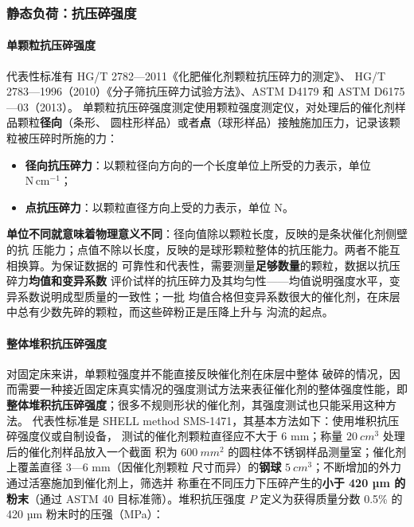 \subsubsection{静态负荷：抗压碎强度}

\paragraph{单颗粒抗压碎强度}代表性标准有 HG/T 2782—2011《化肥催化剂颗粒抗压碎力的测定》、
HG/T 2783—1996（2010）《分子筛抗压碎力试验方法》、ASTM D4179 和 ASTM D6175—03（2013）。
单颗粒抗压碎强度测定使用颗粒强度测定仪，对处理后的催化剂样品颗粒\textbf{径向}（条形、
圆柱形样品）或者\textbf{点}（球形样品）接触施加压力，记录该颗粒被压碎时所施的力：

\begin{itemize}
\item \textbf{径向抗压碎力}：以颗粒径向方向的一个长度单位上所受的力表示，单位
$\mathrm{N\,cm^{-1}}$；
\item \textbf{点抗压碎力}：以颗粒直径方向上受的力表示，单位 N。
\end{itemize}

\textbf{单位不同就意味着物理意义不同}：径向值除以颗粒长度，反映的是条状催化剂侧壁的抗
压能力；点值不除以长度，反映的是球形颗粒整体的抗压能力。两者不能互相换算。为保证数据的
可靠性和代表性，需要测量\textbf{足够数量}的颗粒，数据以抗压碎力\textbf{均值和变异系数}
评价试样的抗压碎力及其均匀性——均值说明强度水平，变异系数说明成型质量的一致性；一批
均值合格但变异系数很大的催化剂，在床层中总有少数先碎的颗粒，而这些碎粉正是压降上升与
沟流的起点。

\paragraph{整体堆积抗压碎强度}对固定床来讲，单颗粒强度并不能直接反映催化剂在床层中整体
破碎的情况，因而需要一种接近固定床真实情况的强度测试方法来表征催化剂的整体强度性能，即
\textbf{整体堆积抗压碎强度}；很多不规则形状的催化剂，其强度测试也只能采用这种方法。
代表性标准是 SHELL method SMS-1471，其基本方法如下：使用堆积抗压碎强度仪或自制设备，
测试的催化剂颗粒直径应不大于 6 mm；称量 $\qty{20}{cm^3}$ 处理后的催化剂样品放入一个截面
积为 $\qty{600}{mm^2}$ 的圆柱体不锈钢样品测量室；催化剂上覆盖直径 3—6 mm（因催化剂颗粒
尺寸而异）的\textbf{钢球} $\qty{5}{cm^3}$；不断增加的外力通过活塞施加到催化剂上，筛选并
称重在不同压力下压碎产生的\textbf{小于
420 µm 的粉末}（通过 ASTM 40 目标准筛）。堆积抗压强度 $P$ 定义为获得质量分数 0.5\% 的
420 µm 粉末时的压强（MPa）：

